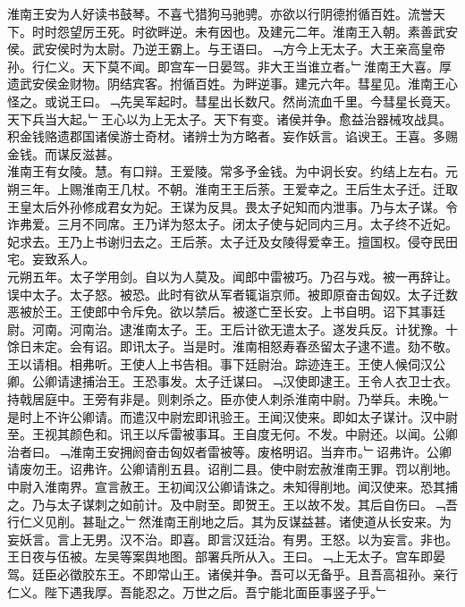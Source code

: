 \documentclass{zhvt-classic}
\begin{document}
\hspace*{2em}淮南王安为人好读书鼓琴。不喜弋猎狗马驰骋。亦欲以行阴德拊循百姓。流誉天下。时时怨望厉王死。时欲畔逆。未有因也。及建元二年。淮南王入朝。素善武安侯。武安侯时为太尉。乃逆王霸上。与王语曰。﹁方今上无太子。大王亲高皇帝孙。行仁义。天下莫不闻。即宫车一日晏驾。非大王当谁立者。﹂淮南王大喜。厚遗武安侯金财物。阴结宾客。拊循百姓。为畔逆事。建元六年。彗星见。淮南王心怪之。或说王曰。﹁先吴军起时。彗星出长数尺。然尚流血千里。今彗星长竟天。天下兵当大起。﹂王心以为上无太子。天下有变。诸侯并争。愈益治器械攻战具。积金钱赂遗郡国诸侯游士奇材。诸辨士为方略者。妄作妖言。谄谀王。王喜。多赐金钱。而谋反滋甚。\\
\hspace*{2em}淮南王有女陵。慧。有口辩。王爱陵。常多予金钱。为中诇长安。约结上左右。元朔三年。上赐淮南王几杖。不朝。淮南王王后荼。王爱幸之。王后生太子迁。迁取王皇太后外孙修成君女为妃。王谋为反具。畏太子妃知而内泄事。乃与太子谋。令诈弗爱。三月不同席。王乃详为怒太子。闭太子使与妃同内三月。太子终不近妃。妃求去。王乃上书谢归去之。王后荼。太子迁及女陵得爱幸王。擅国权。侵夺民田宅。妄致系人。\\
\hspace*{2em}元朔五年。太子学用剑。自以为人莫及。闻郎中雷被巧。乃召与戏。被一再辞让。误中太子。太子怒。被恐。此时有欲从军者辄诣京师。被即原奋击匈奴。太子迁数恶被於王。王使郎中令斥免。欲以禁后。被遂亡至长安。上书自明。诏下其事廷尉。河南。河南治。逮淮南太子。王。王后计欲无遣太子。遂发兵反。计犹豫。十馀日未定。会有诏。即讯太子。当是时。淮南相怒寿春丞留太子逮不遣。劾不敬。王以请相。相弗听。王使人上书告相。事下廷尉治。踪迹连王。王使人候伺汉公卿。公卿请逮捕治王。王恐事发。太子迁谋曰。﹁汉使即逮王。王令人衣卫士衣。持戟居庭中。王旁有非是。则刺杀之。臣亦使人刺杀淮南中尉。乃举兵。未晚。﹂是时上不许公卿请。而遣汉中尉宏即讯验王。王闻汉使来。即如太子谋计。汉中尉至。王视其颜色和。讯王以斥雷被事耳。王自度无何。不发。中尉还。以闻。公卿治者曰。﹁淮南王安拥阏奋击匈奴者雷被等。废格明诏。当弃市。﹂诏弗许。公卿请废勿王。诏弗许。公卿请削五县。诏削二县。使中尉宏赦淮南王罪。罚以削地。中尉入淮南界。宣言赦王。王初闻汉公卿请诛之。未知得削地。闻汉使来。恐其捕之。乃与太子谋刺之如前计。及中尉至。即贺王。王以故不发。其后自伤曰。﹁吾行仁义见削。甚耻之。﹂然淮南王削地之后。其为反谋益甚。诸使道从长安来。为妄妖言。言上无男。汉不治。即喜。即言汉廷治。有男。王怒。以为妄言。非也。\\
\hspace*{2em}王日夜与伍被。左吴等案舆地图。部署兵所从入。王曰。﹁上无太子。宫车即晏驾。廷臣必徵胶东王。不即常山王。诸侯并争。吾可以无备乎。且吾高祖孙。亲行仁义。陛下遇我厚。吾能忍之。万世之后。吾宁能北面臣事竖子乎。﹂\\
\end{document}
